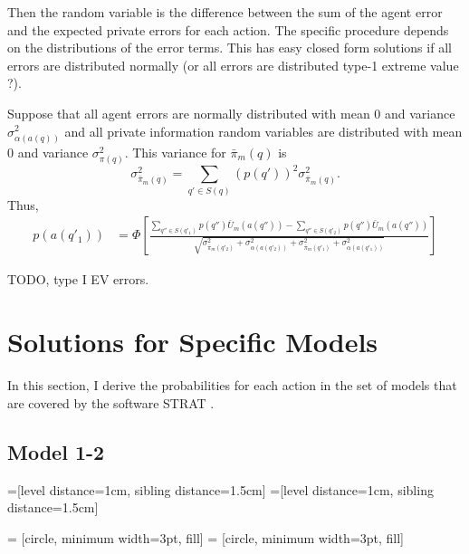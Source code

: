 \documentclass{article}
\begin{document}
Then the random variable is the difference between the sum of the agent error and the expected private errors for each action.
The specific procedure depends on the distributions of the error terms.  
This has easy closed form solutions if all errors are distributed normally (or all errors are distributed type-1 extreme value ?).

Suppose that all agent errors are normally distributed with mean 0 and variance $\sigma^{2}_{\alpha(a(q))}$ and all private information random variables are distributed with mean 0 and variance $\sigma^{2}_{\pi(q)}$.
This variance for $\bar{\pi}_{m}(q)$ is 
\begin{equation*}
  \sigma^{2}_{\bar{\pi}_{m}(q)} = \sum_{q' \in S(q)} (p(q'))^{2} \sigma^{2}_{\bar{\pi}_{m}(q)}. 
\end{equation*}
Thus, 
\begin{align*}
  p(a(q'_{1})) &= 
  \Phi 
  \left[
  \frac{
    \sum_{q'' \in S(q'_{1})} p(q'') \bar{U}_{m}(a(q'')) - \sum_{q'' \in S(q'_{2})} p(q'') \bar{U}_{m}(a(q''))
}
{\sqrt{
    \sigma^{2}_{\bar{\pi}_{m}(q'_{2})} + \sigma^{2}_{\alpha(a(q'_{2}))} 
    + \sigma^{2}_{\bar{\pi}_{m}(q'_{1})} + \sigma^{2}_{\alpha(a(q'_{1}))}}}
  \right]
\end{align*}

TODO, type I EV errors.

\section{Solutions for Specific Models}

In this section, I derive the probabilities for each action in the set of models that are covered by the software STRAT \cite{Signorino2003a}.

\subsection{Model 1-2}
\label{sec:Model-1-2}

=[level distance=1cm, sibling distance=1.5cm]
=[level distance=1cm, sibling distance=1.5cm]

 = [circle, minimum width=3pt, fill]
 = [circle, minimum width=3pt, fill]

\end{document}
